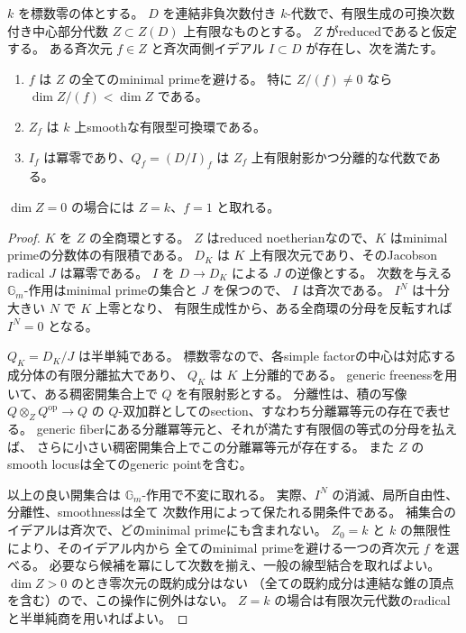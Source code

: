 \begin{lemma}[有限中心代数の良い稠密開集合]\label{lem:generic-separable}
 \(k\) を標数零の体とする。
 \(D\) を連結非負次数付き \(k\)-代数で、有限生成の可換次数付き中心部分代数
 \(Z\subset Z(D)\) 上有限なものとする。
 \(Z\) がreducedであると仮定する。
 ある斉次元 \(f\in Z\) と斉次両側イデアル \(I\subset D\) が存在し、次を満たす。
 \begin{enumerate}
 \item \(f\) は \(Z\) の全てのminimal primeを避ける。
       特に \(Z/(f)\ne0\) なら \(\dim Z/(f)<\dim Z\) である。
 \item \(Z_f\) は \(k\) 上smoothな有限型可換環である。
 \item \(I_f\) は冪零であり、\(Q_f=(D/I)_f\) は
       \(Z_f\) 上有限射影かつ分離的な代数である。
 \end{enumerate}
 \(\dim Z=0\) の場合には \(Z=k\)、\(f=1\) と取れる。
\end{lemma}
\begin{proof}
 \(K\) を \(Z\) の全商環とする。
 \(Z\) はreduced noetherianなので、\(K\) はminimal primeの分数体の有限積である。
 \(D_K\) は \(K\) 上有限次元であり、そのJacobson radical \(J\) は冪零である。
 \(I\) を \(D\to D_K\) による \(J\) の逆像とする。
 次数を与える \(\mathbb G_m\)-作用はminimal primeの集合と \(J\) を保つので、
 \(I\) は斉次である。
 \(I^N\) は十分大きい \(N\) で \(K\) 上零となり、
 有限生成性から、ある全商環の分母を反転すれば \(I^N=0\) となる。

 \(Q_K=D_K/J\) は半単純である。
 標数零なので、各simple factorの中心は対応する成分体の有限分離拡大であり、
 \(Q_K\) は \(K\) 上分離的である。
 generic freenessを用いて、ある稠密開集合上で \(Q\) を有限射影とする。
 分離性は、積の写像 \(Q\otimes_ZQ^{\mathrm{op}}\to Q\) の
 \(Q\)-双加群としてのsection、すなわち分離冪等元の存在で表せる。
 generic fiberにある分離冪等元と、それが満たす有限個の等式の分母を払えば、
 さらに小さい稠密開集合上でこの分離冪等元が存在する。
 また \(Z\) のsmooth locusは全てのgeneric pointを含む。

 以上の良い開集合は \(\mathbb G_m\)-作用で不変に取れる。
 実際、\(I^N\) の消滅、局所自由性、分離性、smoothnessは全て
 次数作用によって保たれる開条件である。
 補集合のイデアルは斉次で、どのminimal primeにも含まれない。
 \(Z_0=k\) と \(k\) の無限性により、そのイデアル内から
 全てのminimal primeを避ける一つの斉次元 \(f\) を選べる。
 必要なら候補を冪にして次数を揃え、一般の線型結合を取ればよい。
 \(\dim Z>0\) のとき零次元の既約成分はない
 （全ての既約成分は連結な錐の頂点を含む）ので、この操作に例外はない。
 \(Z=k\) の場合は有限次元代数のradicalと半単純商を用いればよい。
\end{proof}

